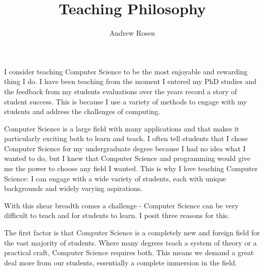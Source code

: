 \documentclass[a4paper]{article}
\author{Andrew Rosen}
\title{Teaching Philosophy}
\date{}
\begin{document}
\maketitle
%
%
%

I consider teaching Computer Science to be the most enjoyable and rewarding thing I do.
I have been teaching from the moment I entered my PhD studies and the feedback from my students evaluations over the years record a story of student success. 
This is because I use a variety of methods to engage with my students and address the challenges of computing.

% 


Computer Science is a large field with many applications and that makes it particularly exciting both to learn and teach.
I often tell students that I chose Computer Science for my undergraduate degree because I had no idea what I wanted to do, but I knew that Computer Science and programming would give me the power to choose any field I wanted.
This is why I love teaching Computer Science:  I can engage with a wide variety of students, each with unique backgrounds and widely varying aspirations.

With this shear breadth comes a challenge - Computer Science can be very difficult to teach and for students to learn.
I posit three reasons for this.

The first factor is that Computer Science is a completely new and foreign field for the vast majority of students.
Where many degrees teach a system of theory or a practical craft, Computer Science requires both. 
This means we demand a great deal more from our students, essentially a complete immersion in the field.
\end{document}
